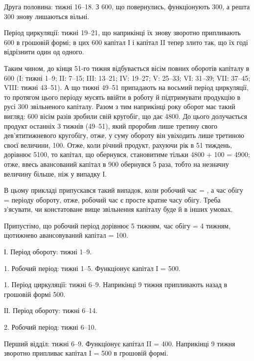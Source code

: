 Друга половина: тижні 16--18. З 600, що повернулись,
функціонують 300, а решта 300 знову лишаються
вільні.

Період циркуляції: тижні 19--21, що наприкінці їх знову зворотно
припливають 600 в грошовій формі; в цих 600
капітал І і капітал II тепер злито так, що їх годі відрізнити один од одного.

Таким чином, до кінця 51-го тижня відбувається вісім повних оборотів
капіталу в 600 (І: тижні 1--9; II: 7--15; III: 13--21;
IV: 19--27; V: 25--33; VI: 31--39; VII: 37--45; VIII: тижні
43--51). А що тижні 49--51 припадають на восьмий період циркуляції,
то протягом цього періоду мусять ввійти в роботу й підтримувати
продукцію в русі 300 звільненого капіталу. Разом з тим наприкінці
року оборот має такий вигляд: 600 вісім разів зробили
свій кругобіг, що дає 4800. До цього долучається продукт
останніх 3 тижнів (49--51), який проробив лише третину свого дев’ятитижневого
кругобігу, отже, у суму обороту він увіходить лише третиною
своєї величини, 100. Отже, коли річний продукт, рахуючи рік в
51 тиждень, дорівнює 5100, то капітал, що обернувся, становитиме
тільки 4800 + 100 = 4900; отже, ввесь авансований капітал
в 900 обернувся 5 раза, тобто на незначну величину більше,
ніж у випадку І.

В цьому прикладі припускався такий випадок, коли робочий час = ,
а час обігу =  періоду обороту, отже, робочий час є просте кратне
часу обігу. Треба з’ясувати, чи констатоване вище звільнення капіталу
буде й в інших умовах.

Припустімо, що робочий період дорівнює 5 тижням, час обігу = 4 тижням,
щотижнево авансовуваний капітал = 100.

І. Період обороту: тижні 1--9.

1. Робочий період: тижні 1--5. Функціонує капітал I = 500.

1. Період циркуляції: тижні 6--9. Наприкінці 9 тижня припливають
назад в грошовій формі 500.

ІІ. Період обороту: тижні 6--14.

2. Робочий період: тижні 6--10.

Перший відділ: тижні 6--9. Функціонує капітал II = 400.
Наприкінці 9 тижня зворотно припливає капітал I = 500 в грошовій
формі.

